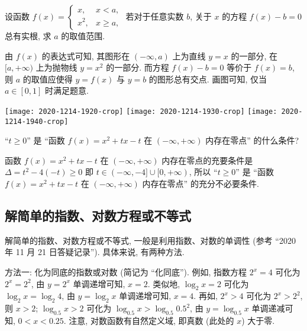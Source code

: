 \begin{example}
    设函数 $f(x)= \begin{cases}
        x, & x<a,\\
        x^2, & x\geqslant a,
    \end{cases}$ 若对于任意实数 $b$, 关于 $x$ 的方程 $f(x)-b=0$ 总有实根, 求 $a$ 的取值范围.
\end{example}
\begin{solution}
    由 $f(x)$ 的表达式可知, 其图形在 $(-\infty,a)$ 上为直线 $y=x$ 的一部分, 在 $[a,+\infty)$ 上为抛物线 $y=x^2$ 的一部分. 而方程 $f(x)-b=0$ 等价于 $f(x)=b$, 则 $a$ 的取值应使得 $y=f(x)$ 与 $y=b$ 的图形总有交点. 画图可知, 仅当 $a\in[0,1]$ 时满足题意.
    
    \begin{center}
        \texttt{[image: 2020-1214-1920-crop]}\qquad
        \texttt{[image: 2020-1214-1930-crop]}\qquad
        \texttt{[image: 2020-1214-1940-crop]}
    \end{center}
\end{solution}

\begin{example}
    ``$t\geqslant 0$'' 是 ``函数 $f(x)= x^2+tx-t$ 在 $(-\infty,+\infty)$ 内存在零点'' 的什么条件? 
\end{example}
\begin{solution}
    函数 $f(x)= x^2+tx-t$ 在 $(-\infty,+\infty)$ 内存在零点的充要条件是 $\Delta= t^2-4(-t)\geqslant 0$ 即 $t\in(-\infty,-4]\cup [0,+\infty)$, 所以 ``$t\geqslant 0$'' 是 ``函数 $f(x)= x^2+tx-t$ 在 $(-\infty,+\infty)$ 内存在零点'' 的充分不必要条件.
\end{solution}

\subsection{解简单的指数、对数方程或不等式}

解简单的指数、对数方程或不等式, 一般是利用指数、对数的单调性 (参考 ``2020 年 11 月 21 日答疑记录''). 具体来说, 有两种方法.

方法一: 化为同底的指数或对数 (简记为 ``化同底''). 例如, 指数方程 $2^x=4$ 可化为 $2^x=2^2$, 由 $y=2^x$ 单调递增可知, $x=2$. 类似地, $\log_2 x= 2$ 可化为 $\log_2 x= \log_2 4$, 由 $y=\log_2 x$ 单调递增可知, $x=4$. 再如, $2^x>4$ 可化为 $2^x>2^2$, 则 $x>2$; $\log_{0.5} x> 2$ 可化为 $\log_{0.5} x> \log_{0.5} 0.5^2$, 由 $y=\log_{0.5} x$ 单调递减可知, $0<x< 0.25$. 注意, 对数函数有自然定义域, 即真数 (此处的 $x$) 大于零.

